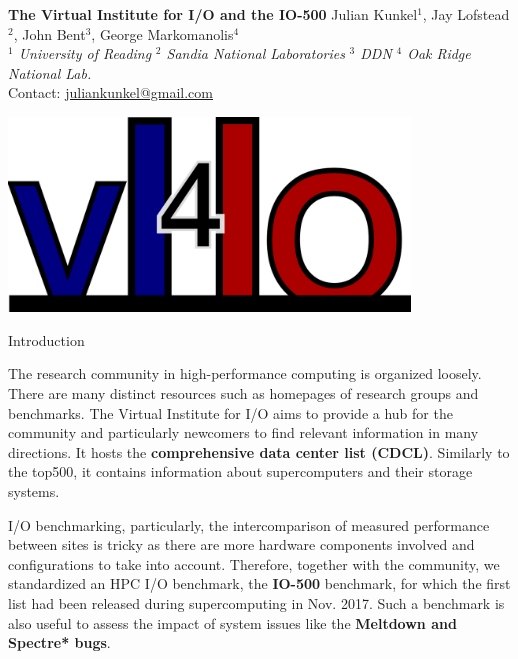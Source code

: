 \documentclass[portrait,a0paper,fontscale=0.4]{baposter}
\begin{document}
\begin{poster}
{}{ %
  \textbf{The Virtual Institute for I/O and the IO-500}
}{ %
  \vspace{0.5em}
  \textsc
  Julian Kunkel$^1$, Jay Lofstead$^2$, John Bent$^3$, George Markomanolis$^4$
  \\[0.5em]
  \emph{$^1$ University of Reading}
  \hspace*{0.25em}
  \emph{$^2$ Sandia National Laboratories}
   \hspace*{0.25em}
  \emph{$^3$ DDN}
  \hspace*{0.25em}
  \emph{$^4$ Oak Ridge National Lab.}
  \\[0.5em]
   Contact: \url{juliankunkel@gmail.com}
}{
    \begin{minipage}{0.2\textwidth}
     \begin{center}
      \includegraphics[width=0.8\textwidth]{logo-vi4io.png}
     \end{center}
    \end{minipage}
}


\begin{posterbox}[name=problem,column=0]
{Introduction}

The research community in high-performance computing is organized loosely.
There are many distinct resources such as homepages of research groups and benchmarks.
The Virtual Institute for I/O aims to provide a hub for the community and particularly newcomers to find relevant information in many directions.
It hosts the \textbf{comprehensive data center list (CDCL)}. Similarly to the top500, it contains information about supercomputers and their storage systems.

I/O benchmarking, particularly, the intercomparison of measured performance between sites is tricky as there are more hardware components involved and configurations to take into account.
Therefore, together with the community, we standardized an HPC I/O benchmark, the \textbf{IO-500} benchmark, for which the first list had been released during supercomputing in Nov. 2017.
Such a benchmark is also useful to assess the impact of system issues like the \textbf{Meltdown and Spectre* bugs}.%


\end{posterbox}
\end{poster}
\end{document}
